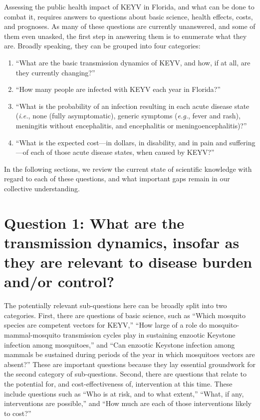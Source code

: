 \documentclass[12pt]{article}
\newcommand{\eg}{\textit{e.g.}}
\newcommand{\ie}{\textit{i.e.}}
\begin{document}
        Assessing the public health impact of KEYV in Florida, and what can be done to combat it, requires answers to questions about basic science, health effects, costs, and prognoses. As many of these questions are currently unanswered, and some of them even unasked, the first step in answering them is to enumerate what they are. Broadly speaking, they can be grouped into four categories:
        \begin{enumerate}
            \item ``What are the basic transmission dynamics of KEYV, and how, if at all, are they currently changing?''
            \item ``How many people are infected with KEYV each year in Florida?''
            \item ``What is the probability of an infection resulting in each acute disease state (\ie, none (fully asymptomatic), generic symptoms (\eg, fever and rash), meningitis without encephalitis, and encephalitis or meningoencephalitis)?''
            \item ``What is the expected cost---in dollars, in disability, and in pain and suffering---of each of those acute disease states, when caused by KEYV?''
        \end{enumerate}

        In the following sections, we review the current state of scientific knowledge with regard to each of these questions, and what important gaps remain in our collective understanding.

    \section[Transmission dynamics]{Question 1: What are the transmission dynamics, insofar as they are relevant to disease burden and/or control?}
    \label{transmission-dynamics}
        The potentially relevant sub-questions here can be broadly split into two categories. First, there are questions of basic science, such as ``Which mosquito species are competent vectors for KEYV,'' ``How large of a role do mosquito-mammal-mosquito transmission cycles play in sustaining enzootic Keystone infection among mosquitoes,'' and ``Can enzootic Keystone infection among mammals be sustained during periods of the year in which mosquitoes vectors are absent?'' These are important questions because they lay essential groundwork for the second category of sub-questions. Second, there are questions that relate to the potential for, and cost-effectiveness of, intervention at this time. These include questions such as ``Who is at risk, and to what extent,'' ``What, if any, interventions are possible,'' and ``How much are each of those interventions likely to cost?''
\end{document}
